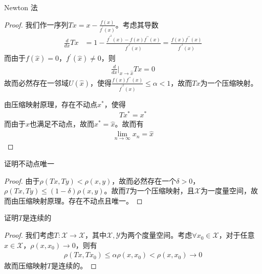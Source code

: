 \begin{exercise}
    Newton 法
\end{exercise}
\begin{proof}
    我们作一序列$Tx = x - \frac{f(x)}{f^{\prime}(x)}$。考虑其导数
    \begin{align*}
        \frac{d}{dx} Tx &= 1 - \frac{f^{\prime^2}(x) - f(x)f^{\prime\prime}(x)}{f^{\prime^2}(x)} = \frac{f(x)f^{\prime\prime}(x)}{f^{\prime^2}(x)}
    \end{align*}
    而由于$f(\hat{x}) = 0$，$f^{\prime}(\hat{x}) \neq 0$，则
    \begin{align*}
        \frac{d}{dx}\bigg|_{x\to\hat{x}} Tx = 0
    \end{align*}
    故而必然存在一邻域$U(\hat{x})$，使得$\frac{f(x)f^{\prime\prime}(x)}{f^{\prime^2}(x)}\leq \alpha <1$，故而$Tx$为一个压缩映射。
    
    由压缩映射原理，存在不动点$x^*$，使得
    \begin{align*}
        Tx^* = x^*
    \end{align*}
    而由于$\hat{x}$也满足不动点，故而$x^* = \hat{x}$。故而有
    \begin{align*}
        \lim\limits_{n\to\infty} x_n = \hat{x}
    \end{align*}
\end{proof}

\begin{exercise}
    证明不动点唯一
\end{exercise}
\begin{proof}
    由于$\rho(Tx, Ty) < \rho(x, y)$，故而必然存在一个$\delta > 0$，$\rho(Tx, Ty)\leqslant(1-\delta)\rho(x, y)$。故而$T$为一个压缩映射，且$\mathscr{X}$为一度量空间，故而由压缩映射原理。存在不动点且唯一。
\end{proof}

\begin{exercise}
    证明$T$是连续的
\end{exercise}
\begin{proof}
    我们考虑$T: \mathscr{X}\to\mathscr{X}$，其中$\mathscr{X}, \mathscr{Y}$为两个度量空间。考虑$\forall x_0\in\mathscr{X}$，对于任意$x\in\mathscr{X}$，$\rho(x, x_0)\to 0$，则有
    \begin{align*}
        \rho(Tx, Tx_0) \leqslant \alpha\rho(x, x_0) < \rho(x, x_0) \to 0
    \end{align*}
    故而压缩映射$T$是连续的。
\end{proof}

